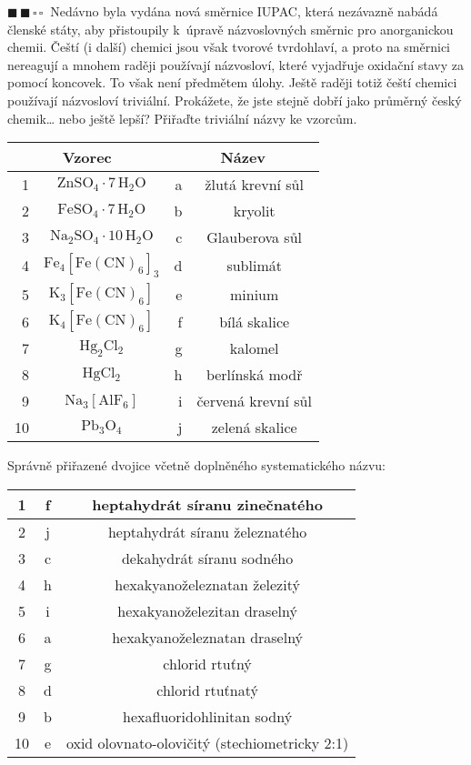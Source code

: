 \documentclass{book}
\newcommand{\dva}{$\blacksquare \, \blacksquare \, \square \, \square \; \; $}
\renewenvironment{quotation}{\par}{\par} %
\begin{document}
\hrulefill %
\begin{quotation}
\dva Nedávno byla vydána nová směrnice IUPAC, která nezávazně nabádá členské
státy, aby přistoupily k~úpravě názvoslovných směrnic pro anorganickou
chemii. Čeští (i další) chemici jsou však tvorové tvrdohlaví, a proto
na směrnici nereagují a mnohem raději používají názvosloví, které
vyjadřuje oxidační stavy za pomocí koncovek. To však není předmětem
úlohy. Ještě raději totiž čeští chemici používají názvosloví triviální.
Prokážete, že jste stejně dobří jako průměrný český chemik… nebo ještě
lepší? Přiřaďte triviální názvy ke vzorcům. 

\noindent \begin{center}
\begin{tabular}{r|c||r|c}

\multicolumn{2}{c||}{Vzorec}  &\multicolumn{2}{c}{Název}\\
\hline 
\hline 
1 &$\mathrm{ZnSO_{4}\cdot7\,H_{2}O}$ & a & žlutá krevní sůl\tabularnewline
\hline 
2&$\mathrm{FeSO_{4}\cdot7\,H_{2}O}$ & b & kryolit\tabularnewline
\hline 
3& $\mathrm{Na_{2}SO_{4}\cdot10\,H_{2}O}$ & c & Glauberova sůl\tabularnewline
\hline 
4&$\mathrm{Fe_{4}[Fe(CN)_{6}]_{3}}$ & d & sublimát\tabularnewline
\hline 
5&$\mathrm{K_{3}[Fe(CN)_{6}]}$ & e & minium\tabularnewline
\hline 
6&$\mathrm{K_{4}[Fe(CN)_{6}]}$ & f & bílá skalice\tabularnewline
\hline 
7&$\mathrm{Hg_{2}Cl_{2}}$ & g & kalomel\tabularnewline
\hline 
8&$\mathrm{HgCl_{2}}$ & h & berlínská modř\tabularnewline
\hline 
9& $\mathrm{Na_{3}[AlF_{6}]}$ & i & červená krevní sůl\tabularnewline
\hline 
10&$\mathrm{Pb_{3}O_{4}}$ & j & zelená skalice\tabularnewline
\end{tabular}
\end{center}
\end{quotation} \dotfill \par 
Správně přiřazené dvojice včetně doplněného systematického názvu: 

\begin{center}
\begin{tabular}{c|c|c}
1 & f & heptahydrát síranu zinečnatého \\ \hline
2 & j & heptahydrát síranu železnatého \\ \hline
3 & c & dekahydrát síranu sodného \\ \hline
4 & h & hexakyanoželeznatan železitý \\ \hline
5 & i & hexakyanoželezitan draselný \\ \hline
6 & a & hexakyanoželeznatan draselný \\ \hline
7 & g & chlorid rtuťný \\ \hline
8 & d & chlorid rtuťnatý \\ \hline
9 & b & hexafluoridohlinitan sodný \\ \hline
10 & e & oxid olovnato-olovičitý (stechiometricky 2:1) \\ 
\end{tabular}
\end{center}
\end{document}

